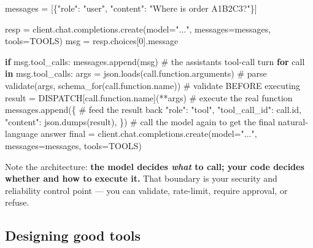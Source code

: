 \documentclass[11pt]{article}
\newenvironment{Shaded}{\begin{snugshade}}{\end{snugshade}}
\newcommand{\BuiltInTok}[1]{\textcolor[rgb]{0.50,0.55,0.55}{#1}}
\newcommand{\CommentTok}[1]{\textcolor[rgb]{0.48,0.49,0.49}{#1}}
\newcommand{\ControlFlowTok}[1]{\textcolor[rgb]{0.99,0.74,0.29}{\textbf{#1}}}
\newcommand{\DecValTok}[1]{\textcolor[rgb]{0.96,0.45,0.00}{#1}}
\newcommand{\KeywordTok}[1]{\textcolor[rgb]{0.81,0.81,0.76}{\textbf{#1}}}
\newcommand{\NormalTok}[1]{\textcolor[rgb]{0.81,0.81,0.76}{#1}}
\newcommand{\OperatorTok}[1]{\textcolor[rgb]{0.81,0.81,0.76}{#1}}
\newcommand{\StringTok}[1]{\textcolor[rgb]{0.96,0.31,0.31}{#1}}
\begin{document}
\begin{Shaded}
\begin{Highlighting}[]
\NormalTok{messages }\OperatorTok{=}\NormalTok{ [\{}\StringTok{"role"}\NormalTok{: }\StringTok{"user"}\NormalTok{, }\StringTok{"content"}\NormalTok{: }\StringTok{"Where is order A1B2C3?"}\NormalTok{\}]}

\NormalTok{resp }\OperatorTok{=}\NormalTok{ client.chat.completions.create(model}\OperatorTok{=}\StringTok{"..."}\NormalTok{, messages}\OperatorTok{=}\NormalTok{messages, tools}\OperatorTok{=}\NormalTok{TOOLS)}
\NormalTok{msg }\OperatorTok{=}\NormalTok{ resp.choices[}\DecValTok{0}\NormalTok{].message}

\ControlFlowTok{if}\NormalTok{ msg.tool\_calls:}
\NormalTok{    messages.append(msg)                                  }\CommentTok{\# the assistant\textquotesingle{}s tool{-}call turn}
    \ControlFlowTok{for}\NormalTok{ call }\KeywordTok{in}\NormalTok{ msg.tool\_calls:}
\NormalTok{        args }\OperatorTok{=}\NormalTok{ json.loads(call.function.arguments)        }\CommentTok{\# parse}
\NormalTok{        validate(args, schema\_for(call.function.name))    }\CommentTok{\# validate BEFORE executing}
\NormalTok{        result }\OperatorTok{=}\NormalTok{ DISPATCH[call.function.name](}\OperatorTok{**}\NormalTok{args)     }\CommentTok{\# execute the real function}
\NormalTok{        messages.append(\{                                 }\CommentTok{\# feed the result back}
            \StringTok{"role"}\NormalTok{: }\StringTok{"tool"}\NormalTok{,}
            \StringTok{"tool\_call\_id"}\NormalTok{: call.}\BuiltInTok{id}\NormalTok{,}
            \StringTok{"content"}\NormalTok{: json.dumps(result),}
\NormalTok{        \})}
    \CommentTok{\# call the model again to get the final natural{-}language answer}
\NormalTok{    final }\OperatorTok{=}\NormalTok{ client.chat.completions.create(model}\OperatorTok{=}\StringTok{"..."}\NormalTok{, messages}\OperatorTok{=}\NormalTok{messages, tools}\OperatorTok{=}\NormalTok{TOOLS)}
\end{Highlighting}
\end{Shaded}

Note the architecture: \textbf{the model decides \emph{what} to call; your code decides whether and how to execute it.} That boundary is your security and reliability control point --- you can validate, rate-limit, require approval, or refuse.

\subsection{Designing good tools}\label{designing-good-tools}
\end{document}
